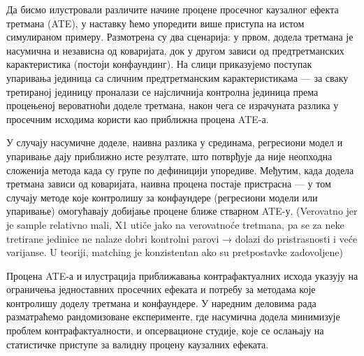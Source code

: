 \documentclass[12pt, a4paper]{article}
\begin{document}
Да бисмо илустровали различите начине процене просечног каузалног ефекта третмана (ATE), у наставку ћемо упоредити више приступа на истом симулираном примеру.
Размотрена су два сценарија: у првом, додела третмана је насумична и независна од коваријата, док у другом зависи од предтретманских карактеристика (постоји конфаундинг).
На слици приказујемо поступак упаривања јединица са сличним предтретманским карактеристикама — за сваку третираној јединицу проналази се најсличнија контролна 
јединица према процењеној вероватноћи доделе третмана, након чега се израчуната разлика у просечним исходима користи као приближна процена ATE-а.

У случају насумичне доделе, наивна разлика у срединама, регресиони модел и упаривање дају приближно исте резултате, што потврђује да није неопходна сложенија метода када 
су групе по дефиницији упоредиве. Међутим, када додела третмана зависи од коваријата, наивна процена постаје пристрасна — у том случају методе које контролишу за 
конфаундере (регресиони модели или упаривање) омогућавају добијање процене ближе стварном ATE-у.  (Verovatno jer je sample relativno mali, X1 utiče jako na verovatnoće tretmana, pa se za neke tretirane jedinice ne nalaze dobri kontrolni parovi → dolazi do pristrasnosti i veće varijanse.
U teoriji, matching je konzistentan ako su pretpostavke zadovoljene)


Процена ATE-а и илустрација приближавања контрафактуалних исхода указују на ограничења једноставних просечних ефеката и потребу за методама које контролишу доделу 
третмана и конфаундере. У наредним деловима рада разматраћемо рандомизоване експерименте, где насумична додела минимизује проблем контрафактуалности, и опсервационе 
студије, које се ослањају на статистичке приступе за валидну процену каузалних ефеката.





\end{document}
